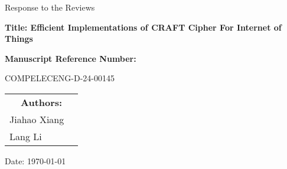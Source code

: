 \begin{titlepage}
    \centering
    {\LARGE Response to the Reviews \par}
    \vspace{1.5cm}

    {\large \bfseries Title: Efficient Implementations of CRAFT Cipher For Internet of Things\par}
    \vspace{1.5cm}

    {\large \bfseries Manuscript Reference Number: \par
        COMPELECENG-D-24-00145}
    \vspace{1.5cm}

    \begin{table}[h!]
        \renewcommand{\arraystretch}{1}
        \centering
        \begin{tabular}{lc}
            \multicolumn{2}{c}{\large \bfseries Authors:} \\
            \large Jiahao Xiang                           \\
            \large Lang Li                                \\
        \end{tabular}
    \end{table}
    \vspace{1.5cm}
    \large Date: \today

\end{titlepage}
